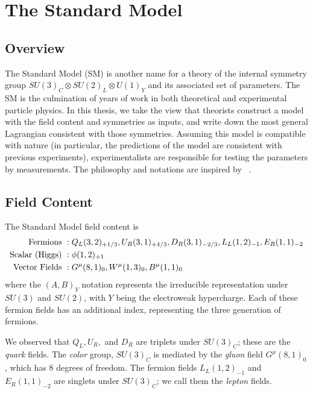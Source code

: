 \chapter{The Standard Model}\label{ch:sm}

\section{Overview}

The Standard Model (SM) is another name for a theory of the internal symmetry group $SU(3)_C \otimes SU(2)_L \otimes U(1)_Y$ and its associated set of parameters.
The SM is the culmination of years of work in both theoretical and experimental particle physics.
In this thesis, we take the view that theorists construct a model with the field content and symmetries as inputs, and write down the most general Lagrangian consistent with those symmetries.
Assuming this model is compatible with nature (in particular, the predictions of the model are consistent with previous experiments), experimentalists are responsible for testing the parameters by measurements.
The philosophy and notations are inspired by ~\cite{yuvalSMLectures, Buchmuller:984122}.

\section{Field Content}\label{sec:field_content}

The Standard Model field content is
\begin{align}
\text{Fermions }       &:  Q_L(3,2)_{+1/3}, \xspace  U_R(3,1)_{+4/3},\xspace  D_R(3,1)_{-2/3} ,\xspace  L_L(1,2)_{-1} ,\xspace  E_R(1,1)_{-2} \notag \\
\text{Scalar (Higgs) } &:  \phi(1,2)_{+1} \\
\text{Vector Fields }  &:  G^\mu(8,1)_0 , \xspace W^\mu(1,3)_0 , \xspace B^\mu(1,1)_0 \notag
\end{align}
where the $(A, B)_Y$ notation represents the irreducible representation under $SU(3)$ and $SU(2)$, with $Y$ being the electroweak hypercharge.
Each of these fermion fields has an additional index, representing the three generation of fermions.

We observed that $Q_L, U_R,$ and $D_R$ are triplets under $SU(3)_C$; these are the \textit{quark} fields.
The \textit{color} group, $SU(3)_C$ is mediated by the \textit{gluon} field $G^\mu(8,1)_0$, which has 8 degrees of freedom.
The fermion fields $L_L(1,2)_{-1}$ and $  E_R(1,1)_{-2} $ are singlets under $SU(3)_C$; we call them the \textit{lepton} fields.

